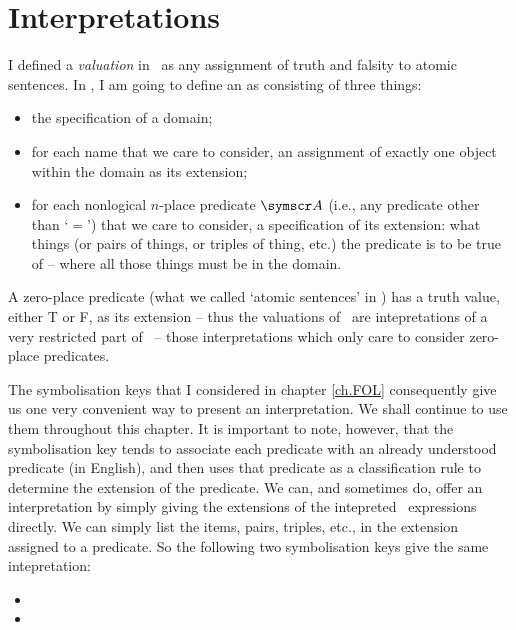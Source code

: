 \section{Interpretations} \label{ss.int}
I defined a \emph{valuation} in \TFL\ as any assignment of truth and falsity to atomic sentences. In \FOL, I am going to define an  as consisting of three things:
	\begin{itemize}	
		\item the specification of a domain;
		\item for each name that we care to consider, an assignment of exactly one object within the domain as its extension;
		\item for each nonlogical $n$-place predicate $\meta{A}$ (i.e., any predicate other than `$=$') that we care to consider, a specification of its extension: what things (or pairs of things, or triples of thing, etc.) the predicate is to be true of – where all those things must be in the domain.
	\end{itemize}
A zero-place predicate (what we called `atomic sentences' in \TFL) has a truth value, either T or F, as its extension – thus the valuations of \TFL\ are intepretations of a very restricted part of \FOL\ – those interpretations which only care to consider zero-place predicates.

The symbolisation keys that I considered in chapter \ref{ch.FOL} consequently give us one very convenient way to present an interpretation. We shall continue to use them throughout this chapter. It is important to note, however, that the symbolisation key tends to associate each predicate with an already understood predicate (in English), and then uses that predicate as a classification rule to determine the extension of the predicate. We can, and sometimes do, offer an interpretation by simply giving the extensions of the intepreted \FOL\ expressions directly. We can simply list the items, pairs, triples, etc., in the extension assigned to a predicate. So the following two symbolisation keys give the same intepretation: 
\begin{itemize}
	\item {} 
\item {}
\end{itemize}

